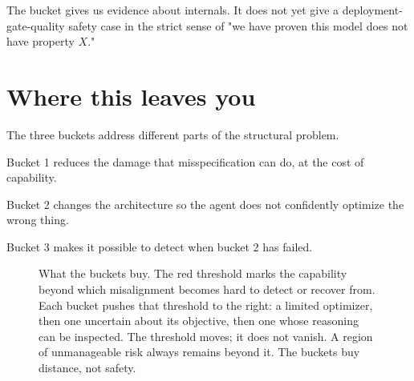 The bucket gives us evidence about internals. It does not yet give a deployment-gate-quality safety case in the strict sense of "we have proven this model does not have property $X$."

\section*{Where this leaves you}

The three buckets address different parts of the structural problem.

Bucket 1 reduces the damage that misspecification can do, at the cost of capability.

Bucket 2 changes the architecture so the agent does not confidently optimize the wrong thing.

Bucket 3 makes it possible to detect when bucket 2 has failed.

\begin{figure}[h]
\centering
{}
\caption{What the buckets buy. The red threshold marks the capability beyond which misalignment becomes hard to detect or recover from. Each bucket pushes that threshold to the right: a limited optimizer, then one uncertain about its objective, then one whose reasoning can be inspected. The threshold moves; it does not vanish. A region of unmanageable risk always remains beyond it. The buckets buy distance, not safety.}
\label{fig:threshold}
\end{figure}

